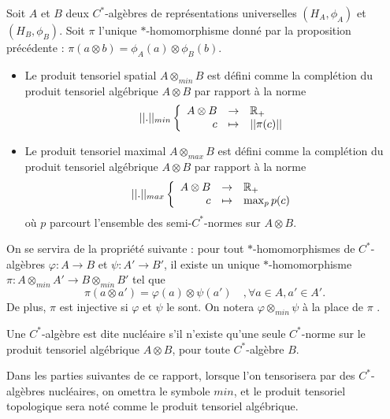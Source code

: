 \begin{definition}
Soit $A$ et $B$ deux $C^*$-algèbres de représentations universelles $(H_A, \phi_A)$ et $(H_B, \phi_B)$. Soit $\pi$ l'unique $*$-homomorphisme donné par la proposition précédente : $\pi(a\otimes b ) = \phi_A(a)\otimes \phi_B(b)$.
\begin{itemize}
\item Le produit tensoriel spatial $A\otimes_{min} B$ est défini comme la complétion du produit tensoriel algébrique $A\otimes B$ par rapport à la norme 
\[||.||_{min}\left\{\begin{array}{rcl} A\otimes B & \rightarrow & \mathbb R_+ \\ c & \mapsto & ||\pi(c)||\end{array}\right.\]
\item Le produit tensoriel maximal $A\otimes_{max} B$ est défini comme la complétion du produit tensoriel algébrique $A\otimes B$ par rapport à la norme 
\[||.||_{max}\left\{\begin{array}{rcl} A\otimes B & \rightarrow & \mathbb R_+ \\ c & \mapsto & \max_{p} p(c)\end{array}\right.\]
où $p$ parcourt l'ensemble des semi-$C^*$-normes sur $A\otimes B$.
\end{itemize}
\end{definition}

On se servira de la propriété suivante : pour tout $*$-homomorphismes de $C^*$-algèbres $\varphi : A\rightarrow B$ et $\psi :  A'\rightarrow B'$, il existe un unique $*$-homomorphisme $\pi : A\otimes_{min} A' \rightarrow B\otimes_{min} B'$ tel que 
\[\pi(a\otimes a')=\varphi(a)\otimes \psi (a')\quad , \forall a\in A,a'\in A'.\]
De plus, $\pi $ est injective si $\varphi$ et $\psi$ le sont. On notera $\varphi\otimes_{min}\psi$ à la place de $\pi$ .\\

\begin{definition}
Une $C^*$-algèbre est dite nucléaire s'il n'existe qu'une seule $C^*$-norme sur le produit tensoriel algébrique $A\otimes B$, pour toute $C^*$-algèbre $B$.
\end{definition}

Dans les parties suivantes de ce rapport, lorsque l'on tensorisera par des $C^*$-algèbres nucléaires, on omettra le symbole $min$, et le produit tensoriel topologique sera noté comme  le produit tensoriel algébrique.

